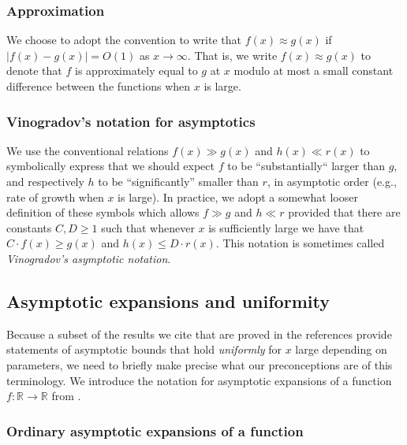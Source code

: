 \documentclass[11pt,reqno,a4letter]{article}
\numberwithin{figure}{section}
\numberwithin{table}{section}
\theoremstyle{plain}
\numberwithin{theorem}{section}
\theoremstyle{definition}
\begin{document}
\subsubsection{Approximation} 
     
We choose to adopt the convention to write that $f(x) \approx g(x)$ if $|f(x) - g(x)| = O(1)$ as 
$x \rightarrow \infty$. 
That is, we write $f(x) \approx g(x)$ to denote that $f$ is approximately equal to $g$ at $x$ modulo at most a
small constant difference between the functions when $x$ is large. 

\subsubsection{Vinogradov's notation for asymptotics} 

We use the conventional relations $f(x) \gg g(x)$ and $h(x) \ll r(x)$ to symbolically express that we should expect 
$f$ to be ``substantially`` larger than $g$, and respectively $h$ 
to be ``significantly'' smaller than $r$, in asymptotic order 
(e.g., rate of growth when $x$ is large). In practice, we adopt a somewhat looser definition of these symbols which 
allows $f \gg g$ and $h \ll r$ provided that there are constants $C, D \geq 1$ such that whenever $x$ is sufficiently 
large we have that $C \cdot f(x) \geq g(x)$ and $h(x) \leq D \cdot r(x)$. This notation is sometimes called 
\emph{Vinogradov's asymptotic notation}. 

\subsection{Asymptotic expansions and uniformity} 

Because a subset of the results we cite that are proved in the references 
provide statements of 
asymptotic bounds that hold \emph{uniformly} for $x$ large depending on parameters, 
we need to briefly make precise what our preconceptions are of this terminology. 
We introduce the notation for asymptotic expansions of a function $f: \mathbb{R} \rightarrow \mathbb{R}$ from 
\cite[\S 2.1(iii)]{NISTHB}. 

\subsubsection{Ordinary asymptotic expansions of a function} 
\end{document}

